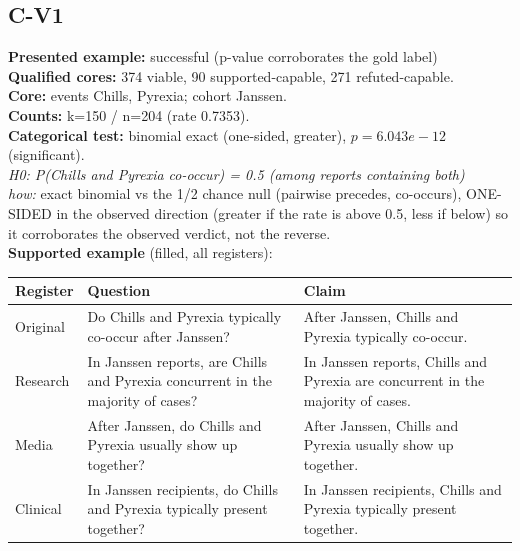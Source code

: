 \documentclass[11pt]{article}
\begin{document}
\subsection*{C-V1}
\textbf{Presented example:} successful (p-value corroborates the gold label) \\
\textbf{Qualified cores:} 374 viable, 90 supported-capable, 271 refuted-capable. \\
\textbf{Core:} events Chills, Pyrexia; cohort Janssen. \\
\textbf{Counts:} k=150 / n=204  (rate 0.7353). \\
\textbf{Categorical test:} binomial exact (one-sided, greater), $p = 6.043e-12$ (significant). \\
\emph{H0: P(Chills and Pyrexia co-occur) = 0.5 (among reports containing both)} \\
\emph{how:} exact binomial vs the 1/2 chance null (pairwise precedes, co-occurs), ONE-SIDED in the observed direction (greater if the rate is above 0.5, less if below) so it corroborates the observed verdict, not the reverse. \\
\textbf{Supported example} (filled, all registers): \\
\begin{tabularx}{\linewidth}{@{}l L L@{}}
\toprule
\textbf{Register} & \textbf{Question} & \textbf{Claim} \\
\midrule
Original & Do Chills and Pyrexia typically co-occur after Janssen? & After Janssen, Chills and Pyrexia typically co-occur. \\
Research & In Janssen reports, are Chills and Pyrexia concurrent in the majority of cases? & In Janssen reports, Chills and Pyrexia are concurrent in the majority of cases. \\
Media & After Janssen, do Chills and Pyrexia usually show up together? & After Janssen, Chills and Pyrexia usually show up together. \\
Clinical & In Janssen recipients, do Chills and Pyrexia typically present together? & In Janssen recipients, Chills and Pyrexia typically present together. \\
\bottomrule
\end{tabularx}
\vspace{3pt}
\end{document}
